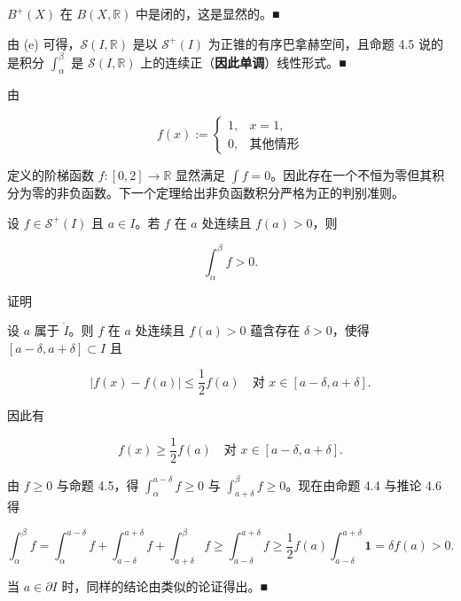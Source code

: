 \begin{remark}
\begin{items}
\proofhead
$ B^{+}(X) $ 在 $ B(X, \mathbb{R}) $ 中是闭的，这是显然的。\nobreak\hspace{0.35em}■
\item

由 (e) 可得，$ \mathcal{S}(I, \mathbb{R}) $ 是以 $ \mathcal{S}^{+}(I) $ 为正锥的有序巴拿赫空间，且命题 4.5 说的是积分 $ \int_{\alpha}^{\beta} $ 是 $ \mathcal{S}(I, \mathbb{R}) $ 上的连续正（\textbf{因此单调}）线性形式。\nobreak\hspace{0.35em}■

\end{items}

由

\begin{equation*}
f(x) := \begin{cases} 1, & x = 1, \\ 0, & \text{其他情形} \end{cases}
\end{equation*}

定义的阶梯函数 $ f : [0, 2] \to \mathbb{R} $ 显然满足 $ \int f = 0 $。因此存在一个不恒为零但其积分为零的非负函数。下一个定理给出非负函数积分严格为正的判别准则。

\end{remark}

\begin{proposition}

设 $ f \in \mathcal{S}^{+}(I) $ 且 $ a \in I $。若 $ f $ 在 $ a $ 处连续且 $ f(a) > 0 $，则

\[
\int_{\alpha}^{\beta} f > 0 .
\]

证明

\begin{subitems}
\item

设 $ a $ 属于 $ \mathring{I} $。则 $ f $ 在 $ a $ 处连续且 $ f(a) > 0 $ 蕴含存在 $ \delta > 0 $，使得 $ [a - \delta, a + \delta] \subset I $ 且

\[
|f(x) - f(a)| \le \frac{1}{2}f(a) \quad \text{对 } x \in [a - \delta, a + \delta] .
\]

因此有

\[
f(x) \ge \frac{1}{2}f(a) \quad \text{对 } x \in [a - \delta, a + \delta] .
\]

由 $ f \ge 0 $ 与命题 4.5，得 $ \int_{\alpha}^{a-\delta} f \ge 0 $ 与 $ \int_{a+\delta}^{\beta} f \ge 0 $。现在由命题 4.4 与推论 4.6 得

\[
\int_{\alpha}^{\beta} f = \int_{\alpha}^{a-\delta} f + \int_{a-\delta}^{a+\delta} f + \int_{a+\delta}^{\beta} f \ge \int_{a-\delta}^{a+\delta} f \ge \frac{1}{2}f(a)\int_{a-\delta}^{a+\delta} \mathbf{1} = \delta f(a) > 0 .
\]
\item

当 $ a \in \partial I $ 时，同样的结论由类似的论证得出。\nobreak\hspace{0.35em}■

\end{subitems}

\end{proposition}

